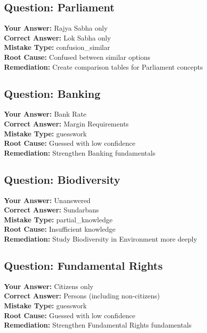 \documentclass[a4paper,12pt]{article}
\begin{document}
\subsection*{Question: Parliament}
\textbf{Your Answer:} \textcolor{wrongred}{Rajya Sabha only} \\
\textbf{Correct Answer:} Lok Sabha only\\
\textbf{Mistake Type:} confusion\_similar\\
\textbf{Root Cause:} Confused between similar options\\
\textbf{Remediation:} Create comparison tables for Parliament concepts\\
\subsection*{Question: Banking}
\textbf{Your Answer:} \textcolor{wrongred}{Bank Rate} \\
\textbf{Correct Answer:} Margin Requirements\\
\textbf{Mistake Type:} guesswork\\
\textbf{Root Cause:} Guessed with low confidence\\
\textbf{Remediation:} Strengthen Banking fundamentals\\
\subsection*{Question: Biodiversity}
\textbf{Your Answer:} \textcolor{wrongred}{Unanswered} \\
\textbf{Correct Answer:} Sundarbans\\
\textbf{Mistake Type:} partial\_knowledge\\
\textbf{Root Cause:} Insufficient knowledge\\
\textbf{Remediation:} Study Biodiversity in Environment more deeply\\
\subsection*{Question: Fundamental Rights}
\textbf{Your Answer:} \textcolor{wrongred}{Citizens only} \\
\textbf{Correct Answer:} Persons (including non-citizens)\\
\textbf{Mistake Type:} guesswork\\
\textbf{Root Cause:} Guessed with low confidence\\
\textbf{Remediation:} Strengthen Fundamental Rights fundamentals\\
\end{document}
